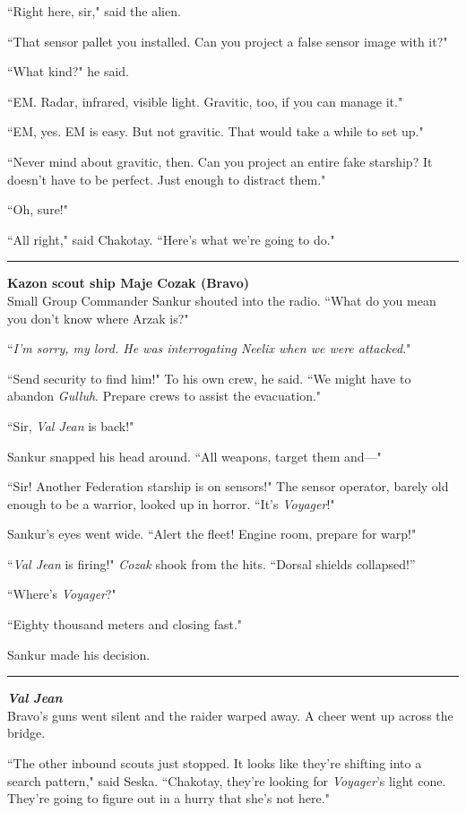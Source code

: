 \documentclass[twoside,letterpaper,12pt]{memoir}
\begin{document}
``Right here, sir," said the alien.

``That sensor pallet you installed. Can you project a false sensor image with it?"

``What kind?" he said.

``EM. Radar, infrared, visible light. Gravitic, too, if you can manage it."

``EM, yes. EM is easy. But not gravitic. That would take a while to set up."

``Never mind about gravitic, then. Can you project an entire fake starship? It doesn't have to be perfect. Just enough to distract them."

``Oh, sure!"

``All right," said Chakotay. ``Here's what we're going to do."

\fancybreak{\rule{3cm}{0.4 pt}}
\noindent\textbf{Kazon scout ship Maje Cozak (Bravo)}\\

Small Group Commander Sankur shouted into the radio. ``What do you mean you don't know where Arzak is?"

``\textit{I'm sorry, my lord. He was interrogating Neelix when we were attacked}."

``Send security to find him!" To his own crew, he said. ``We might have to abandon \textit{Gulluh}. Prepare crews to assist the evacuation."

``Sir, \textit{Val Jean} is back!"

Sankur snapped his head around. ``All weapons, target them and---"

``Sir! Another Federation starship is on sensors!" The sensor operator, barely old enough to be a warrior, looked up in horror. ``It's \textit{Voyager}!"

Sankur's eyes went wide. ``Alert the fleet! Engine room, prepare for warp!"

``\textit{Val Jean} is firing!" \textit{Cozak} shook from the hits. ``Dorsal shields collapsed!”

``Where's \textit{Voyager}?"

``Eighty thousand meters and closing fast."

Sankur made his decision.

\fancybreak{\rule{3cm}{0.4 pt}}
\noindent\textit{\textbf{Val Jean}}\\

Bravo’s guns went silent and the raider warped away. A cheer went up across the bridge.

``The other inbound scouts just stopped. It looks like they're shifting into a search pattern," said Seska. ``Chakotay, they're looking for \textit{Voyager}'s light cone. They're going to figure out in a hurry that she's not here." 
\end{document}
